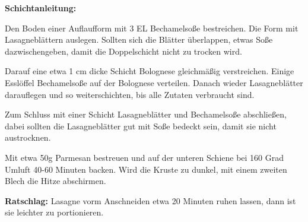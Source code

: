 {\textbf{Schichtanleitung:}

Den Boden einer Auflaufform mit 3 EL Bechamelso\ss{}e bestreichen.
Die Form mit Lasagnebl\"attern auslegen.
Sollten sich die Bl\"atter \"uberlappen, etwas So\ss{}e dazwischengeben, damit die Doppelschicht nicht zu trocken wird.

Darauf eine etwa 1 cm dicke Schicht Bolognese gleichm\"a\ss{}ig verstreichen.
Einige Essl\"offel Bechamelso\ss{}e auf der Bolognese verteilen.
Danach wieder Lasagnebl\"atter darauflegen und so weiterschichten, bis alle Zutaten verbraucht sind.

Zum Schluss mit einer Schicht Lasagnebl\"atter und Bechamelso\ss{}e abschließen, dabei sollten die Lasagnebl\"atter gut mit So\ss{}e bedeckt sein, damit sie nicht austrocknen.

Mit etwa 50g Parmesan bestreuen und auf der unteren Schiene bei 160 Grad Umluft 40-60 Minuten backen.
Wird die Kruste zu dunkel, mit einem zweiten Blech die Hitze abschirmen.

\textbf{Ratschlag:}
Lasagne vorm Anschneiden etwa 20 Minuten ruhen lassen, dann ist sie leichter zu portionieren. }

